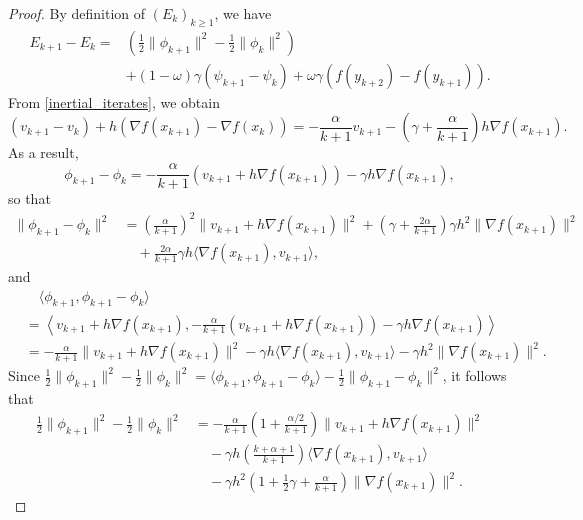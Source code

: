 \documentclass[10pt,a4paper]{amsart}
\begin{document}
\begin{proof}
By definition of $(E_k)_{k\ge 1}$, we have
\begin{align} \label{E:Energy_diff}
E_{k+1} - E_k = & \left( \frac{1}{2}\| \phi_{k+1} \|^2 - \frac{1}{2}\| \phi_k \|^2 \right) \nonumber \\
& + (1-\omega)\gamma (\psi_{k+1} - \psi_k) + \omega\gamma ( f(y_{k+2}) - f(y_{k+1}) ).    
\end{align}
From \eqref{inertial_iterates}, we obtain
\begin{equation}\label{E: iterates}
( v_{k+1} - v_k ) + h\left( \nabla f(x_{k+1}) - \nabla f(x_k) \right)
= -\frac{\alpha}{k+1} v_{k+1} - \left( \gamma + \frac{\alpha}{k+1} \right) h\nabla f(x_{k+1}).
\end{equation}
As a result,
$$ \phi_{k+1} - \phi_k = -\frac{\alpha}{k+1} \left( v_{k+1} + h\nabla f(x_{k+1}) \right) - \gamma h\nabla f(x_{k+1}), $$
so that
\begin{align*}
\| \phi_{k+1} - \phi_k \|^2 
&= \left( \frac{\alpha}{k+1} \right)^2 \| v_{k+1} + h\nabla f(x_{k+1}) \|^2
  + \left( \gamma + \frac{2\alpha}{k+1} \right)\gamma h^2 \| \nabla f(x_{k+1}) \|^2 \\
&\quad + \frac{2\alpha}{k+1}\gamma h \langle \nabla f(x_{k+1}), v_{k+1} \rangle,
\end{align*}
and
\begin{align*}
&\quad \langle \phi_{k+1}, \phi_{k+1} - \phi_k \rangle \\
&= \left\langle v_{k+1} + h\nabla f(x_{k+1}), -\frac{\alpha}{k+1} \left( v_{k+1} + h\nabla f(x_{k+1}) \right) - \gamma h\nabla f(x_{k+1}) \right\rangle \\
&= -\frac{\alpha}{k+1}\| v_{k+1} + h\nabla f(x_{k+1}) \|^2
   -\gamma h \langle \nabla f(x_{k+1}), v_{k+1} \rangle
   -\gamma h^2 \| \nabla f(x_{k+1}) \|^2.
\end{align*}
Since $\frac{1}{2}\| \phi_{k+1} \|^2 - \frac{1}{2}\| \phi_k \|^2 = \langle \phi_{k+1}, \phi_{k+1} - \phi_k \rangle - \frac{1}{2}\| \phi_{k+1} - \phi_k \|^2$, it follows that
\begin{align}\label{E: phi_diff}
\frac{1}{2}\| \phi_{k+1} \|^2 - \frac{1}{2}\| \phi_k \|^2 
&= -\frac{\alpha}{k+1}\left( 1 + \frac{\alpha/2}{k+1} \right)\| v_{k+1} + h\nabla f(x_{k+1}) \|^2 \nonumber \\
&\quad    -\gamma h\left(\frac{k+\alpha+1}{k+1}\right) \langle \nabla f(x_{k+1}), v_{k+1} \rangle  \nonumber \\
&\quad  -\gamma h^2\left( 1 + \frac{1}{2}\gamma + \frac{\alpha}{k+1} \right) \| \nabla f(x_{k+1}) \|^2.

\end{align}
\end{proof}
\end{document}
